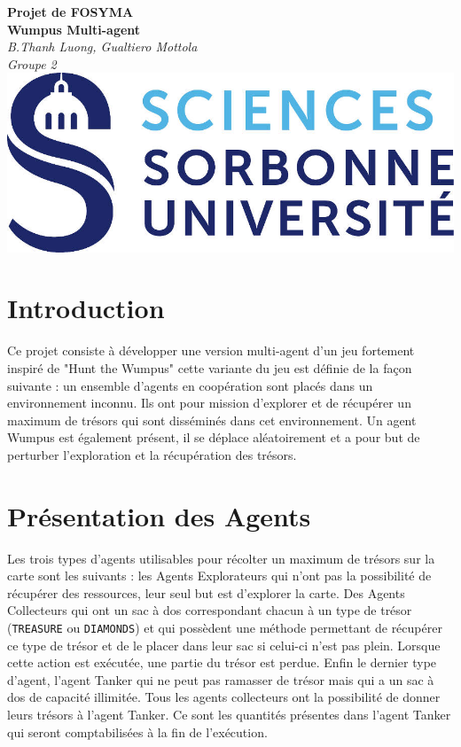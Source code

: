 \documentclass[10pt]{article}
\begin{document}
\begin{center}
	\textbf{\huge Projet de FOSYMA\\[.5cm] Wumpus Multi-agent}\\[.5cm]
	\vspace{1.5cm}
	\textit{\Large B.Thanh Luong, Gualtiero Mottola}\\
	\vspace{1.5cm}
	\textit{Groupe 2}\\
	\vspace{1.5cm}
	\includegraphics{logo}
	\vspace{1.5cm}
	\tableofcontents
\end{center}

\newpage

\section{Introduction}
	Ce projet consiste à développer une version multi-agent d'un jeu fortement inspiré de "Hunt the Wumpus" cette variante du jeu est définie de la façon suivante : un ensemble d'agents en coopération sont placés dans un environnement inconnu. Ils ont pour mission d'explorer et de récupérer un maximum de trésors qui sont disséminés dans cet environnement. Un agent Wumpus est également présent, il se déplace aléatoirement et a pour but de perturber l'exploration et la récupération des trésors.
	
\section{Présentation des Agents}
	Les trois types d'agents utilisables pour récolter un maximum de trésors sur la carte sont les suivants : les Agents Explorateurs qui n'ont pas la possibilité de récupérer des ressources, leur seul but est d'explorer la carte. Des Agents Collecteurs qui ont un sac à dos correspondant chacun à un type de trésor (\texttt{TREASURE} ou \texttt{DIAMONDS}) et qui possèdent une méthode permettant de récupérer ce type de trésor et de le placer dans leur sac si celui-ci n'est pas plein. Lorsque cette action est exécutée, une partie du trésor est perdue. Enfin le dernier type d'agent, l'agent Tanker qui ne peut pas ramasser de trésor mais qui a un sac à dos de capacité illimitée. Tous les agents collecteurs ont la possibilité de donner leurs trésors à l'agent Tanker. Ce sont les quantités présentes dans l'agent Tanker qui seront comptabilisées à la fin de l'exécution.
\end{document}
